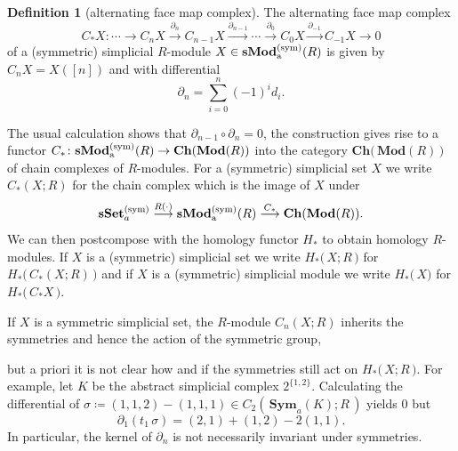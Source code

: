 \documentclass[12pt]{amsart}
\theoremstyle{plain}
\numberwithin{lemma}{\DefaultNumberTheoremWithin}
\numberwithin{claim}{\DefaultNumberTheoremWithin}
\numberwithin{theorem}{\DefaultNumberTheoremWithin}
\numberwithin{corollary}{\DefaultNumberTheoremWithin}
\numberwithin{proposition}{\DefaultNumberTheoremWithin}
\numberwithin{conjecture}{\DefaultNumberTheoremWithin}
\theoremstyle{definition}
\newtheorem*{definition}{Definition}
\theoremstyle{definition}
\numberwithin{question}{\DefaultNumberTheoremWithin}
\theoremstyle{definition}
\numberwithin{problem}{\DefaultNumberTheoremWithin}
\theoremstyle{remark}
\numberwithin{remark}{\DefaultNumberTheoremWithin}
\theoremstyle{remark}
\numberwithin{example}{\DefaultNumberTheoremWithin}
\def\blt{*}
\def\letbe{\coloneqq}
\def \la{\longrightarrow}
\newcommand{\gr}[1]{\mathbf{gr}(#1)} %
\newcommand{\sMod}[2]{\mathbf{sMod}_\textnormal{a}^{\textnormal{#1}}(#2)}  %
\newcommand{\sSet}[1]{\mathbf{sSet}_a^\textnormal{#1}} %
\begin{document}
\begin{definition}[alternating face map complex]\label{def:alternatingfacemapcomplex}
    The alternating face map complex $$C_\blt X \colon
    \cdots \rightarrow C_{n}X \xrightarrow{\partial_n} C_{n-1} X \xrightarrow{\partial_{n-1}} \cdots \xrightarrow{\partial_0} C_0 X
    \xrightarrow{\partial_{-1}} C_{-1} X \rightarrow 0$$ of a (symmetric) simplicial $R$-module $X\in \sMod{(sym)}{R}$ is given by $C_nX=X([n])$ and with differential
    \[
    \partial_n =\sum_{i=0}^n (-1)^i d_i.
    \]
\end{definition}

The usual calculation shows that $\partial_{n-1} \circ \partial_n = 0$, the 
construction gives rise to a functor 
$C_\blt\colon\sMod{(sym)}{R} \to \mathbf{Ch}(\mathbf{Mod}(R))$
into the category $\mathbf{Ch}\big(\,\mathbf{Mod}(R)\,\big)$ of chain complexes of $R$-modules. 
For a (symmetric)
simplicial set $X$ we write $C_\blt(X;R)$
for the chain complex which is the image of $X$ under 
$$\sSet{(sym)} \overset{R(\cdot)}{\la} \sMod{(sym)}{R} \overset{C_\blt}{\la} \mathbf{Ch}(\mathbf{Mod}(R)).$$
We can then postcompose with the homology functor 
$H_\blt$ 
to obtain homology $R$-modules. If $X$ is a (symmetric) simplicial set we
write $H_\blt\big(\,X;R\,\big)$ for $H_\blt \big(\,C_\blt (X;R)\,\big)$ and if $X$ is a (symmetric) simplicial module we write $H_\blt\big(\,X\big)$ 
for $H_\blt \big(\,C_\blt X\,\big)$.


If $X$ is a symmetric simplicial set, the $R$-module $C_n(X;R)$ 
inherits the symmetries and hence the action of the symmetric group,

but a priori it is not clear how and if the symmetries still
act on $H_\blt\big(\, X;R\,\big)$.
For example, let $K$ be the abstract simplicial complex
$2^{ \{1,2\}}$. Cal\-cu\-lat\-ing the differential of $\sigma \letbe (1,1,2)-(1,1,1)
\in C_2(\,\mathbf{Sym}_a(K);R\,)$ yields $0$ but
\[\partial_1 (t_1\,\sigma) = (2,1)+(1,2)-2 (1,1).\] In particular, the 
kernel of $\partial_n$ is not necessarily invariant under
symmetries. 
\end{document}
